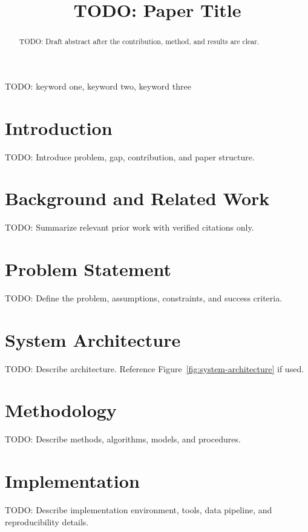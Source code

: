 \documentclass[conference]{IEEEtran}
\begin{document}
\title{TODO: Paper Title}

\author{
}

\maketitle

\begin{abstract}
TODO: Draft abstract after the contribution, method, and results are clear.
\end{abstract}

\begin{IEEEkeywords}
TODO: keyword one, keyword two, keyword three
\end{IEEEkeywords}

\section{Introduction}
TODO: Introduce problem, gap, contribution, and paper structure.

\section{Background and Related Work}
TODO: Summarize relevant prior work with verified citations only.

\section{Problem Statement}
TODO: Define the problem, assumptions, constraints, and success criteria.

\section{System Architecture}
TODO: Describe architecture. Reference Figure~\ref{fig:system-architecture} if used.

\section{Methodology}
TODO: Describe methods, algorithms, models, and procedures.

\section{Implementation}
TODO: Describe implementation environment, tools, data pipeline, and reproducibility details.
\end{document}
